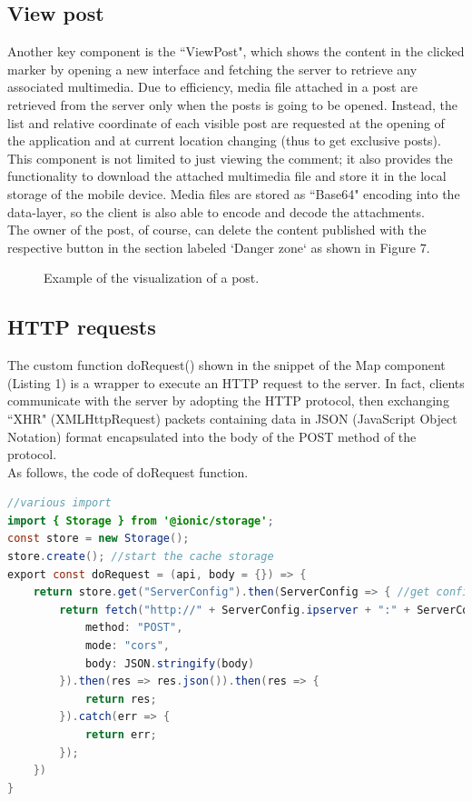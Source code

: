 \documentclass[conference]{IEEEtran}
\begin{document}
\subsection{View post}

Another key component is the ``ViewPost", which shows the content in the clicked marker by opening a new interface and fetching the server to retrieve any associated multimedia.
Due to efficiency, media file attached in a post are retrieved from the server only when the posts is going to be opened.
Instead, the list and relative coordinate of each visible post are requested at the opening of the application and at current location changing (thus to get exclusive posts).
\\
This component is not limited to just viewing the comment; it also provides the functionality to download the attached multimedia file and store it in the local storage of the mobile device.
Media files are stored as ``Base64" encoding into the data-layer, so the client is also able to encode and decode the attachments.
\\
The owner of the post, of course, can delete the content published with the respective button in the section labeled `Danger zone` as shown in Figure 7.

\begin{figure}[htbp]
\begin{center}
\end{center}
\caption{Example of the visualization of a post.}
\label{fig}
\end{figure}
\FloatBarrier 


\subsection{HTTP requests}

The custom function doRequest() shown in the snippet of the Map component (Listing 1) is a wrapper to execute an HTTP request to the server.
In fact, clients communicate with the server by adopting the HTTP protocol, then exchanging ``XHR" (XMLHttpRequest) packets containing data in JSON (JavaScript Object Notation) format encapsulated into the body of the POST method of the protocol.
\\
As follows, the code of doRequest function.
\begin{lstlisting}[language=Java, caption=Method doRequest to fetch server]
//various import 
import { Storage } from '@ionic/storage';
const store = new Storage(); 
store.create(); //start the cache storage
export const doRequest = (api, body = {}) => {
    return store.get("ServerConfig").then(ServerConfig => { //get config from cache
        return fetch("http://" + ServerConfig.ipserver + ":" + ServerConfig.port + "/" + api, {
            method: "POST",
            mode: "cors",
            body: JSON.stringify(body)
        }).then(res => res.json()).then(res => {
            return res;
        }).catch(err => {
            return err;
        });
    })
}
\end{lstlisting}
\end{document}

